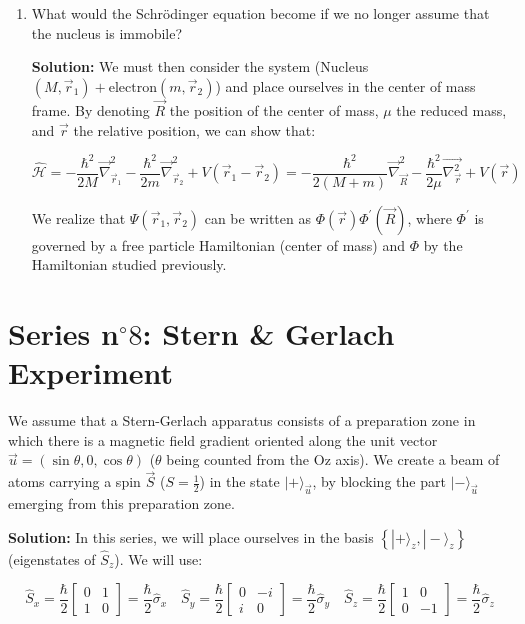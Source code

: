 \documentclass{article}
\begin{document}
\begin{enumerate}
    \item What would the Schrödinger equation become if we no longer assume that the nucleus is immobile?

    {\color{red}\textbf{Solution:} We must then consider the system (Nucleus $(M, \vec{r}_{1}) + \text{electron} (m, \vec{r}_{2})$) and place ourselves in the center of mass frame. By denoting $\vec{R}$ the position of the center of mass, $\mu$ the reduced mass, and $\vec{r}$ the relative position, we can show that:

    $$
    \hat{\mathcal{H}} = -\frac{\hbar^{2}}{2 M} \overrightarrow{\nabla}_{\vec{r}_{1}}^{2} - \frac{\hbar^{2}}{2 m} \overrightarrow{\nabla}_{\vec{r}_{2}}^{2} + V\left(\vec{r}_{1} - \vec{r}_{2}\right) = -\frac{\hbar^{2}}{2(M + m)} \overrightarrow{\nabla}_{\vec{R}}^{2} - \frac{\hbar^{2}}{2 \mu} \overrightarrow{\nabla_{\vec{r}}^{2}} + V(\vec{r})
    $$

    We realize that $\Psi\left(\vec{r}_{1}, \vec{r}_{2}\right)$ can be written as $\Phi(\vec{r}) \Phi^{\prime}(\vec{R})$, where $\Phi^{\prime}$ is governed by a free particle Hamiltonian (center of mass) and $\Phi$ by the Hamiltonian studied previously.}
    
\end{enumerate}

\newpage

    \section*{Series n$^{\circ} 8$: Stern \& Gerlach Experiment}

    We assume that a Stern-Gerlach apparatus consists of a preparation zone in which there is a magnetic field gradient oriented along the unit vector $\vec{u} = (\sin \theta, 0, \cos \theta)$ ($\theta$ being counted from the Oz axis). We create a beam of atoms carrying a spin $\vec{S}$ ($S = \frac{1}{2}$) in the state $|+\rangle_{\vec{u}}$, by blocking the part $|-\rangle_{\vec{u}}$ emerging from this preparation zone.

    {\color{red}\textbf{Solution:} In this series, we will place ourselves in the basis $\left\{|+\rangle_{z}, |-\rangle_{z}\right\}$ (eigenstates of $\hat{S}_{z}$). We will use:

    $$
    \hat{S}_{x} = \frac{\hbar}{2} \begin{bmatrix}
    0 & 1 \\
    1 & 0
    \end{bmatrix} = \frac{\hbar}{2} \hat{\sigma}_{x} \quad \hat{S}_{y} = \frac{\hbar}{2} \begin{bmatrix}
    0 & -i \\
    i & 0
    \end{bmatrix} = \frac{\hbar}{2} \hat{\sigma}_{y} \quad \hat{S}_{z} = \frac{\hbar}{2} \begin{bmatrix}
    1 & 0 \\
    0 & -1
    \end{bmatrix} = \frac{\hbar}{2} \hat{\sigma}_{z}
    $$}
\end{document}
